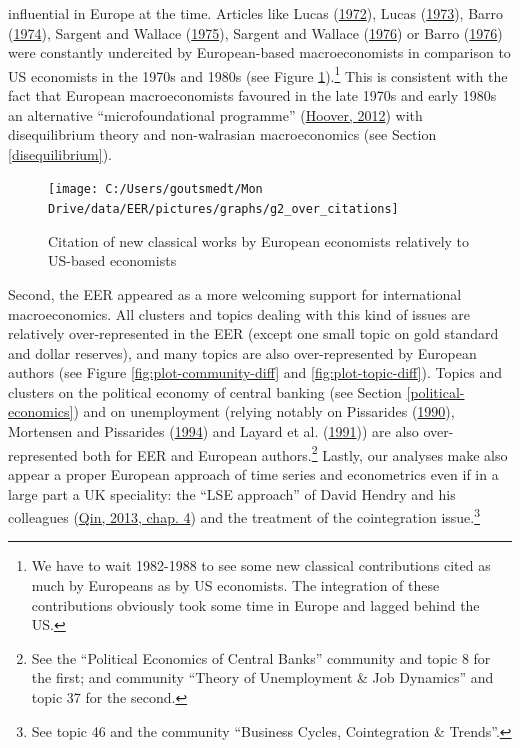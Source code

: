 \documentclass[]{elsarticle} %
\begin{document}
influential in Europe at the time. Articles like Lucas
(\protect\hyperlink{ref-lucas1972}{1972}), Lucas
(\protect\hyperlink{ref-lucas1973}{1973}), Barro
(\protect\hyperlink{ref-barro1974}{1974}), Sargent and Wallace
(\protect\hyperlink{ref-sargent1975}{1975}), Sargent and Wallace
(\protect\hyperlink{ref-sargent1976}{1976}) or Barro
(\protect\hyperlink{ref-barro1976}{1976}) were constantly undercited by
European-based macroeconomists in comparison to US economists in the
1970s and 1980s (see Figure \ref{fig:plot-new-classical}).\footnote{We
  have to wait 1982-1988 to see some new classical contributions cited
  as much by Europeans as by US economists. The integration of these
  contributions obviously took some time in Europe and lagged behind the
  US.} This is consistent with the fact that European macroeconomists
favoured in the late 1970s and early 1980s an alternative
``microfoundational programme''
(\protect\hyperlink{ref-hoover2012}{Hoover, 2012}) with disequilibrium
theory and non-walrasian macroeconomics (see Section
\ref{disequilibrium}).

\begin{figure}[h]

{\centering \texttt{[image: C:/Users/goutsmedt/Mon Drive/data/EER/pictures/graphs/g2\_over\_citations]} 

}

\caption{Citation of new classical works by European economists relatively to US-based economists}\label{fig:plot-new-classical}
\end{figure}

Second, the EER appeared as a more welcoming support for international
macroeconomics. All clusters and topics dealing with this kind of issues
are relatively over-represented in the EER (except one small topic on
gold standard and dollar reserves), and many topics are also
over-represented by European authors (see Figure
\ref{fig:plot-community-diff} and \ref{fig:plot-topic-diff}). Topics and
clusters on the political economy of central banking (see Section
\ref{political-economics}) and on unemployment (relying notably on
Pissarides (\protect\hyperlink{ref-pissarides1990}{1990}), Mortensen and
Pissarides (\protect\hyperlink{ref-mortensen1994}{1994}) and Layard et
al. (\protect\hyperlink{ref-layard1991a}{1991})) are also
over-represented both for EER and European authors.\footnote{See the
  ``Political Economics of Central Banks'' community and topic 8 for the
  first; and community ``Theory of Unemployment \& Job Dynamics'' and
  topic 37 for the second.} Lastly, our analyses make also appear a
proper European approach of time series and econometrics even if in a
large part a UK speciality: the ``LSE approach'' of David Hendry and his
colleagues (\protect\hyperlink{ref-qin2013a}{Qin, 2013, chap. 4}) and
the treatment of the cointegration issue.\footnote{See topic 46 and the
  community ``Business Cycles, Cointegration \& Trends''.}
\end{document}
